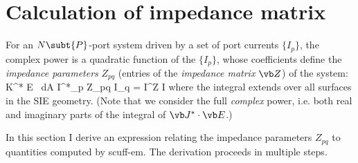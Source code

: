 \documentclass[letterpaper]{article}
\begin{document}
\newpage
\section{Calculation of impedance matrix}

For an $N\subt{P}$-port system driven by a set of port currents $\{I_p\}$,
the complex power is a quadratic function of the $\{I_p\}$,
whose coefficients define the \textit{impedance parameters} $Z_{pq}$
(entries of the \textit{impedance matrix} $\vb Z$) of the system:
{  \int \vb K^* \cdot \vb E \, dA
   \equiv {}\sum I^*_p Z_{pq} I_q
   =  \vb I^\dagger \vb Z \vb I
}
where the integral extends over all surfaces in the SIE geometry.
(Note that we consider the full \textit{complex} power, i.e. both
real and imaginary parts of the integral of $\vb J^*\cdot \vb E$.)

In this section I derive an expression relating the impedance parameters $Z_{pq}$
to quantities computed by {\sc scuff-em}. The derivation proceeds in 
multiple steps.
\end{document}
